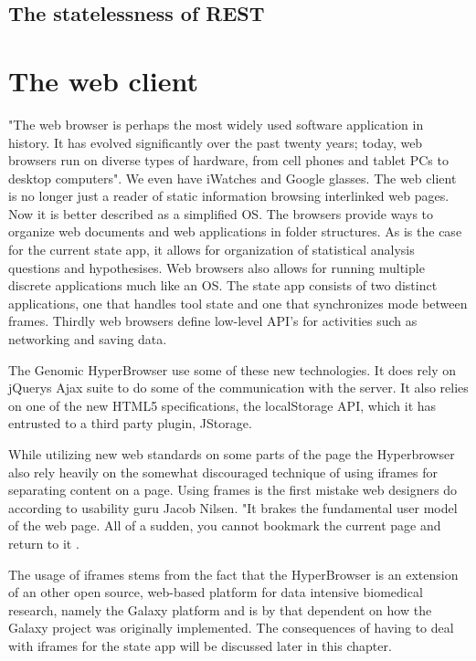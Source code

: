\documentclass[english]{ifimaster}
\begin{document}
\subsection{The statelessness of REST}

\section{The web client}
"The web browser is perhaps the most widely used software application in history. It has evolved significantly over the past twenty years; today, web browsers run on diverse types of hardware, from cell phones and tablet PCs to desktop computers"\parencite[p. 2]{gross}. We even have iWatches and Google glasses. The web client is no longer just a reader of static information browsing interlinked web pages. Now it is better described as a simplified OS\parencite[p.310]{flanagan}. The browsers provide ways to organize web documents and web applications in folder structures. As is the case for the current state app, it allows for organization of statistical analysis questions and hypothesises. Web browsers also allows for running multiple discrete applications much like an OS. The state app consists of two distinct applications, one that handles tool state and one that synchronizes mode between frames. Thirdly web browsers define low-level API's for activities such as networking and saving data. 

The Genomic HyperBrowser use some of these new technologies. It does rely on jQuerys Ajax suite to do some of the communication with the server. It also relies on one of the new HTML5 specifications, the localStorage API, which it has entrusted to a third party plugin, JStorage. 

While utilizing new web standards on some parts of the page the Hyperbrowser also rely heavily on the somewhat discouraged technique of using iframes for separating content on a page. Using frames is the first mistake web designers do according to usability guru Jacob Nilsen. "It brakes the fundamental user model of the web page. All of a sudden, you cannot bookmark the current page and return to it \parencite{nielsen1997user}.

The usage of iframes stems from the fact that the HyperBrowser is an extension of an other open source, web-based platform for data intensive biomedical research, namely the Galaxy platform and is by that dependent on how the Galaxy project was originally implemented. The consequences of having to deal with iframes for the state app will be discussed later in this chapter.
\end{document}
